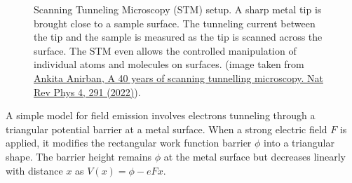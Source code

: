 \documentclass[
  a4paper,
]{book}
\begin{document}
\begin{tcolorbox}
\begin{figure}[H]
\caption{\label{fig-STM}Scanning Tunneling Microscopy (STM) setup. A
sharp metal tip is brought close to a sample surface. The tunneling
current between the tip and the sample is measured as the tip is scanned
across the surface. The STM even allows the controlled manipulation of
individual atoms and molecules on surfaces. (image taken from
\href{https://www.nature.com/articles/s42254-022-00462-2}{Ankita
Anirban, A 40 years of scanning tunnelling microscopy. Nat Rev Phys 4,
291 (2022)}).}

\end{figure}%

\end{tcolorbox}

\begin{tcolorbox}[enhanced jigsaw, coltitle=black, title=\textcolor{quarto-callout-note-color}{\faInfo}\hspace{0.5em}{Field Emission microscopy}, colframe=quarto-callout-note-color-frame, toprule=.15mm, opacitybacktitle=0.6, left=2mm, opacityback=0, breakable, toptitle=1mm, bottomtitle=1mm, leftrule=.75mm, arc=.35mm, titlerule=0mm, colbacktitle=quarto-callout-note-color!10!white, rightrule=.15mm, bottomrule=.15mm, colback=white]

A simple model for field emission involves electrons tunneling through a
triangular potential barrier at a metal surface. When a strong electric
field \(F\) is applied, it modifies the rectangular work function
barrier \(\phi\) into a triangular shape. The barrier height remains
\(\phi\) at the metal surface but decreases linearly with distance \(x\)
as \(V(x) = \phi - eFx\).

\begin{figure}[H]

\end{figure}
\end{tcolorbox}
\end{document}
